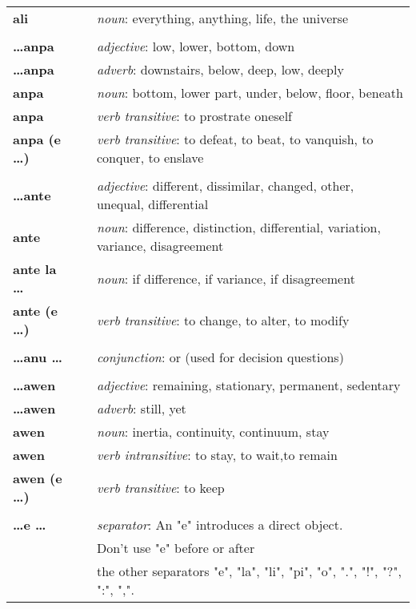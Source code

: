 \begin{supertabular}{p{2,5cm}|ll}
\textbf{ali} && \textit{noun}: everything, anything, life, the universe \\ 
 && \\ %
\textbf{\dots anpa} && \textit{adjective}: low, lower, bottom, down \\ 
\textbf{\dots anpa} && \textit{adverb}: downstairs, below, deep, low, deeply \\ 
\textbf{anpa} && \textit{noun}: bottom, lower part, under, below, floor, beneath \\ 
\textbf{anpa} && \textit{verb transitive}: to prostrate oneself \\
\textbf{anpa (e \dots)} && \textit{verb transitive}: to defeat, to beat, to vanquish, to conquer, to enslave \\ 
 && \\ %
\textbf{\dots ante} && \textit{adjective}: different, dissimilar, changed, other, unequal, differential \\ 
\textbf{ante} && \textit{noun}: difference, distinction, differential, variation, variance, disagreement \\ 
\textbf{ante la \dots} && \textit{noun}: if difference, if variance, if disagreement  \\ 
\textbf{ante (e \dots)} && \textit{verb transitive}: to change, to alter, to modify \\ 
 && \\ %
\textbf{\dots anu \dots} && \textit{conjunction}: or (used for decision questions) \\ 
 && \\ %
\textbf{\dots awen} && \textit{adjective}: remaining, stationary, permanent, sedentary \\ 
\textbf{\dots awen} && \textit{adverb}: still, yet \\ 
\textbf{awen} && \textit{noun}: inertia, continuity, continuum, stay \\ 
\textbf{awen} && \textit{verb intransitive}: to stay, to wait,to remain \\ 
\textbf{awen (e \dots)} && \textit{verb transitive}: to keep \\ 
 && \\ %
\textbf{\dots e \dots} && \textit{separator}: An "e" introduces a direct object. \\ && Don't use "e" before or after \\ && the other separators "e", "la", "li", "pi", "o", ".", "!", "?", ":", ",".  \\ 

\end{supertabular}
